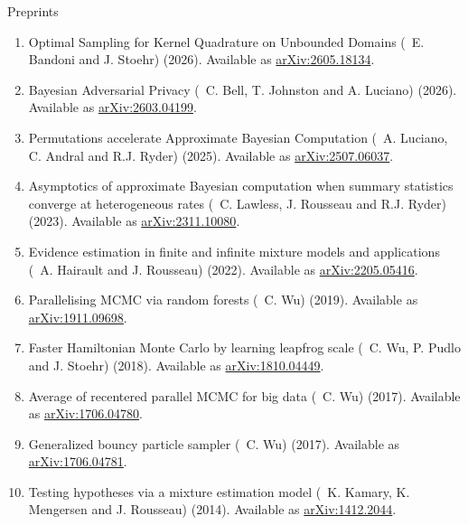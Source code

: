 \bigskip
\centerline{\sc Preprints}

\medskip
\begin{enumerate}
\renewcommand{\theenumi}{[PR-\arabic{enumi}]}

\item Optimal Sampling for Kernel Quadrature on Unbounded Domains
(\avec~E. Bandoni and J. Stoehr) (2026).
Available as \href{https://arxiv.org/abs/2605.18134}{arXiv:2605.18134}.

\item Bayesian Adversarial Privacy (\avec~C. Bell, T. Johnston and A. Luciano) (2026).
Available as \href{https://arxiv.org/abs/2603.04199}{arXiv:2603.04199}.

\item Permutations accelerate Approximate Bayesian Computation
(\avec~A. Luciano, C. Andral and R.J. Ryder) (2025).
Available as \href{https://arxiv.org/abs/2507.06037}{arXiv:2507.06037}.

\item Asymptotics of approximate Bayesian computation when summary statistics
converge at heterogeneous rates (\avec~C. Lawless, J. Rousseau and R.J. Ryder) (2023).
Available as \href{https://arxiv.org/abs/2311.10080}{arXiv:2311.10080}.

\item Evidence estimation in finite and infinite mixture models and applications
(\avec~A. Hairault and J. Rousseau) (2022).
Available as \href{https://arxiv.org/abs/2205.05416}{arXiv:2205.05416}.

\item Parallelising MCMC via random forests (\avec~C. Wu) (2019).
Available as \href{https://arxiv.org/abs/1911.09698}{arXiv:1911.09698}.

\item Faster Hamiltonian Monte Carlo by learning leapfrog scale
(\avec~C. Wu, P. Pudlo and J. Stoehr) (2018).
Available as \href{https://arxiv.org/abs/1810.04449}{arXiv:1810.04449}.

\item Average of recentered parallel MCMC for big data (\avec~C. Wu) (2017).
Available as \href{https://arxiv.org/abs/1706.04780}{arXiv:1706.04780}.

\item Generalized bouncy particle sampler (\avec~C. Wu) (2017).
Available as \href{https://arxiv.org/abs/1706.04781}{arXiv:1706.04781}.

\item Testing hypotheses via a mixture estimation model
(\avec~K. Kamary, K. Mengersen and J. Rousseau) (2014).
Available as \href{https://arxiv.org/abs/1412.2044}{arXiv:1412.2044}.

\end{enumerate}



